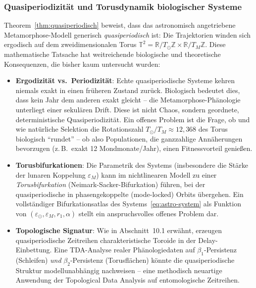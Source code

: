 ﻿\documentclass[12pt, a4paper]{article}
\theoremstyle{definition}
\newcommand{\R}{\mathbb{R}}
\newcommand{\Z}{\mathbb{Z}}
\begin{document}
\subsubsection{Quasiperiodizität und Torusdynamik biologischer Systeme}

Theorem~\ref{thm:quasiperiodisch} beweist, dass das astronomisch angetriebene
Metamorphose-Modell generisch \emph{quasiperiodisch} ist: Die Trajektorien winden
sich ergodisch auf dem zweidimensionalen Torus $\mathbb{T}^2 = \R/T_{\odot}\Z
\times \R/T_M\Z$. Diese mathematische Tatsache hat weitreichende biologische
und theoretische Konsequenzen, die bisher kaum untersucht wurden:

\begin{itemize}
  \item \textbf{Ergodizität vs.\ Periodizität}: Echte quasiperiodische Systeme
        kehren niemals exakt in einen früheren Zustand zurück. Biologisch bedeutet
        dies, dass kein Jahr dem anderen exakt gleicht -- die Metamorphose-Phänologie
        unterliegt einer sekulären Drift. Diese ist nicht Chaos, sondern geordnete,
        deterministische Quasiperiodizität. Ein offenes Problem ist die Frage, ob
        und wie natürliche Selektion die Rotationszahl $T_{\odot}/T_M \approx 12{,}368$
        des Torus biologisch ``rundet'' -- ob also Populationen, die ganzzahlige
        Annäherungen bevorzugen (z.\,B.\ exakt 12 Mondmonate/Jahr), einen
        Fitnessvorteil genießen.

  \item \textbf{Torusbifurkationen}: Die Parametrik des Systems
        (insbesondere die Stärke der lunaren Koppelung $\varepsilon_M$)
        kann im nichtlinearen Modell zu einer \emph{Torusbifurkation}
        (Neimark-Sacker-Bifurkation) führen, bei der quasiperiodische in
        phasengekoppelte (mode-locked) Orbits übergehen. Ein vollständiger
        Bifurkationsatlas des Systems~\eqref{eq:astro-system} als Funktion von
        $(\varepsilon_{\odot}, \varepsilon_M, r_1, \alpha)$ stellt ein
        anspruchsvolles offenes Problem dar.

  \item \textbf{Topologische Signatur}: Wie in Abschnitt~10.1 erwähnt, erzeugen
        quasiperiodische Zeitreihen charakteristische Toroide in der
        Delay-Einbettung. Eine TDA-Analyse realer Phänologiedaten auf
        $\beta_1$-Persistenz (Schleifen) \emph{und} $\beta_2$-Persistenz
        (Torusflächen) könnte die quasiperiodische Struktur modellunabhängig
        nachweisen -- eine methodisch neuartige Anwendung der Topological
        Data Analysis auf entomologische Zeitreihen.
\end{itemize}
\end{document}
